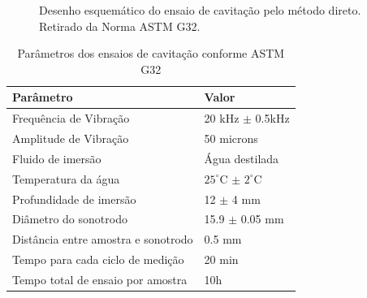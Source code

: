 \begin{figure}
	\centering
	\caption{Desenho esquemático do ensaio de cavitação pelo método direto.
    Retirado da Norma ASTM G32.}
    \label{fig:adequacao5}
\end{figure}

\begin{table}[]
\centering
\caption{Parâmetros dos ensaios de cavitação conforme ASTM G32}
\label{tab:param_hvof}
\begin{tabular}{ll}
\hline
Parâmetro                                                 & Valor                                             \\ \hline
\multicolumn{1}{|l|}{Frequência de Vibração}              & \multicolumn{1}{l|}{20 kHz $\pm$ 0.5kHz}          \\ \hline
\multicolumn{1}{|l|}{Amplitude de Vibração}               & \multicolumn{1}{l|}{50 microns}                   \\ \hline
\multicolumn{1}{|l|}{Fluido de imersão}                   & \multicolumn{1}{l|}{Água destilada}               \\ \hline
\multicolumn{1}{|l|}{Temperatura da água}                 & \multicolumn{1}{l|}{$25^\circ$C $\pm$ $2^\circ$C} \\ \hline
\multicolumn{1}{|l|}{Profundidade de imersão}             & \multicolumn{1}{l|}{12 $\pm$ 4 mm}                \\ \hline
\multicolumn{1}{|l|}{Diâmetro do sonotrodo}               & \multicolumn{1}{l|}{15.9 $\pm$ 0.05 mm}           \\ \hline
\multicolumn{1}{|l|}{Distância entre amostra e sonotrodo} & \multicolumn{1}{l|}{0.5 mm}                       \\ \hline
\multicolumn{1}{|l|}{Tempo para cada ciclo de medição}    & \multicolumn{1}{l|}{20 min}                       \\ \hline
\multicolumn{1}{|l|}{Tempo total de ensaio por amostra}   & \multicolumn{1}{l|}{10h}                          \\ \hline
\end{tabular}
\end{table}

